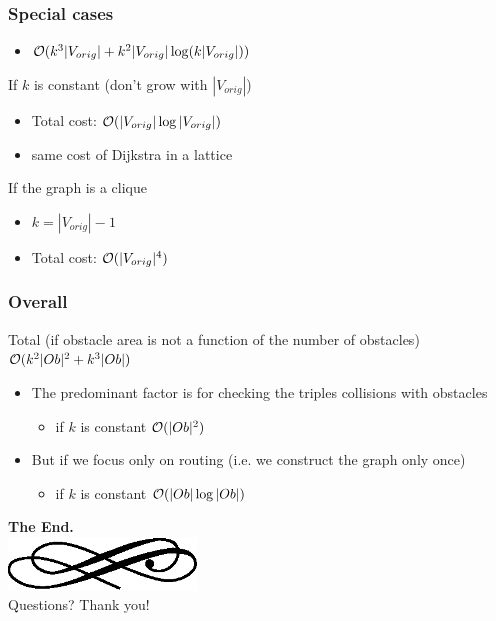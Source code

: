 \begin{frame}
  \frametitle{Special cases}
  \begin{itemize}
  \item $\mathcal{O}(k^3|V_{orig}|+ k^2|V_{orig}|\log(k|V_{orig}|))$\pause
  \end{itemize}

  \begin{block}{If $k$ is constant (don't grow with $|V_{orig}|$)}
    \begin{itemize}
    \item Total cost: \alert{$\mathcal{O}(|V_{orig}|\log|V_{orig}|)$}\pause
    \item same cost of Dijkstra in a lattice\pause
    \end{itemize}
  \end{block}
  \begin{block}{If the graph is a clique}
    \begin{itemize}
    \item $k=|V_{orig}|-1$\pause
    \item Total cost: \alert{$\mathcal{O}(|V_{orig}|^4)$}
    \end{itemize}
  \end{block}
\end{frame}

\begin{frame}
  \frametitle{Overall}
  \begin{block}{Total (if obstacle area is not a function of the
      number of obstacles)}
    \alert{$\mathcal{O}(k^2|Ob|^2+k^3|Ob|)$}\pause
  \end{block}
  \begin{itemize}
  \item The predominant factor is for checking the triples
    collisions with obstacles\pause
    \begin{itemize}
    \item if $k$ is constant \alert{$\mathcal{O}(|Ob|^2)$}\pause
    \end{itemize}
  \item But if we focus only on routing (i.e. we construct the graph
    only once)\pause
    \begin{itemize}
    \item if $k$ is constant \alert{$\mathcal{O}(|Ob|\log|Ob|)$}
    \end{itemize}
  \end{itemize}
\end{frame}

\begin{frame}
  \begin{center}
	\textbf{\calligra\Huge The End.}\\
  \includegraphics[width=5cm]{img/ornament.eps}\\[1cm]
	\pause
	{\huge\calligra Questions?\pause{} Thank you!}
  \end{center}
\end{frame}
